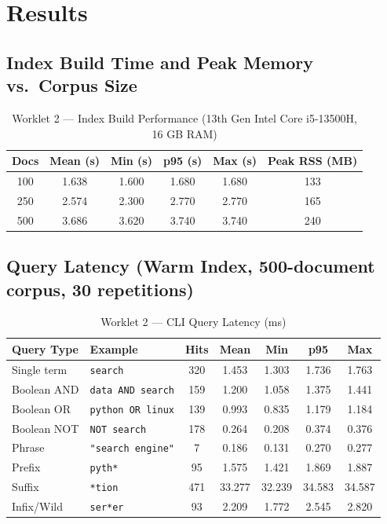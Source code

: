 \documentclass[12pt]{article}
\begin{document}
\section*{Results}

\subsection*{Index Build Time and Peak Memory vs.\ Corpus Size}

\begin{table}[H]
\centering
\caption{Worklet 2 --- Index Build Performance (13th Gen Intel Core i5-13500H, 16 GB RAM)}
\begin{tabular}{|c|c|c|c|c|c|}
\hline
\textbf{Docs} & \textbf{Mean (s)} & \textbf{Min (s)} & \textbf{p95 (s)} & \textbf{Max (s)} & \textbf{Peak RSS (MB)} \\
\hline
100  & 1.638 & 1.600 & 1.680 & 1.680 & 133 \\
250  & 2.574 & 2.300 & 2.770 & 2.770 & 165 \\
500  & 3.686 & 3.620 & 3.740 & 3.740 & 240 \\
\hline
\end{tabular}
\end{table}

\subsection*{Query Latency (Warm Index, 500-document corpus, 30 repetitions)}

\begin{table}[H]
\centering
\caption{Worklet 2 --- CLI Query Latency (ms)}
\begin{tabular}{|l|l|c|c|c|c|c|}
\hline
\textbf{Query Type} & \textbf{Example} & \textbf{Hits} & \textbf{Mean} & \textbf{Min} & \textbf{p95} & \textbf{Max} \\
\hline
Single term  & \texttt{search}            & 320 & 1.453 & 1.303 & 1.736 & 1.763 \\
Boolean AND  & \texttt{data AND search}   & 159 & 1.200 & 1.058 & 1.375 & 1.441 \\
Boolean OR   & \texttt{python OR linux}   & 139 & 0.993 & 0.835 & 1.179 & 1.184 \\
Boolean NOT  & \texttt{NOT search}        & 178 & 0.264 & 0.208 & 0.374 & 0.376 \\
Phrase       & \texttt{"search engine"}   & 7   & 0.186 & 0.131 & 0.270 & 0.277 \\
Prefix       & \texttt{pyth*}             & 95  & 1.575 & 1.421 & 1.869 & 1.887 \\
Suffix       & \texttt{*tion}             & 471 & 33.277 & 32.239 & 34.583 & 34.587 \\
Infix/Wild   & \texttt{ser*er}            & 93  & 2.209 & 1.772 & 2.545 & 2.820 \\
\hline
\end{tabular}
\end{table}
\end{document}
